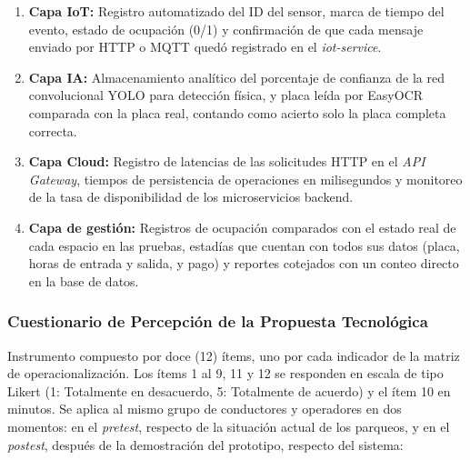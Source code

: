 \documentclass[12pt,a4paper]{article}
\begin{document}
\begin{enumerate}
	\item \textbf{Capa IoT:} Registro automatizado del ID del sensor, marca de tiempo del evento, estado de ocupación (0/1) y confirmación de que cada mensaje enviado por HTTP o MQTT quedó registrado en el \textit{iot-service}.
	\item \textbf{Capa IA:} Almacenamiento analítico del porcentaje de confianza de la red convolucional YOLO para detección física, y placa leída por EasyOCR comparada con la placa real, contando como acierto solo la placa completa correcta.
	\item \textbf{Capa Cloud:} Registro de latencias de las solicitudes HTTP en el \textit{API Gateway}, tiempos de persistencia de operaciones en milisegundos y monitoreo de la tasa de disponibilidad de los microservicios backend.
	\item \textbf{Capa de gestión:} Registros de ocupación comparados con el estado real de cada espacio en las pruebas, estadías que cuentan con todos sus datos (placa, horas de entrada y salida, y pago) y reportes cotejados con un conteo directo en la base de datos.
\end{enumerate}

\subsubsection*{Cuestionario de Percepción de la Propuesta Tecnológica}
Instrumento compuesto por doce (12) ítems, uno por cada indicador de la matriz de operacionalización. Los ítems 1 al 9, 11 y 12 se responden en escala de tipo Likert (1: Totalmente en desacuerdo, 5: Totalmente de acuerdo) y el ítem 10 en minutos. Se aplica al mismo grupo de conductores y operadores en dos momentos: en el \textit{pretest}, respecto de la situación actual de los parqueos, y en el \textit{postest}, después de la demostración del prototipo, respecto del sistema:
\end{document}
